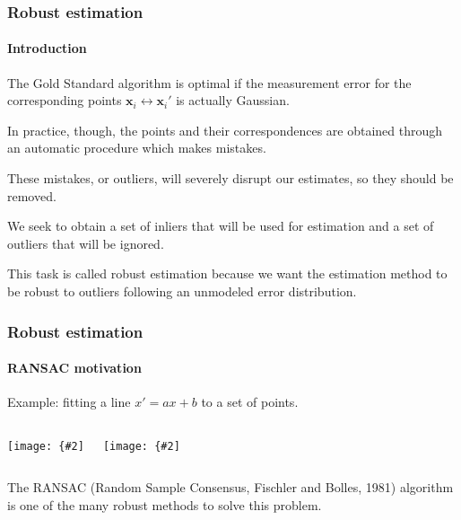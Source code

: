 \documentclass[aspectratio=169]{beamer}
\renewcommand{\vec}[1]{\boldsymbol{#1}}
\newcommand{\myfig}[3]{\centerline{\texttt{[image: \{\#2]}}}
\begin{document}
\begin{frame}
\frametitle{Robust estimation}
\framesubtitle{Introduction}

The Gold Standard algorithm is optimal if the \alert{measurement
  error} for the corresponding points $\vec{x}_i \leftrightarrow
\vec{x}_i'$ is actually \alert{Gaussian}.

\medskip

In practice, though, the points and their correspondences are obtained
through an \alert{automatic} procedure which makes \alert{mistakes}.

\medskip

These mistakes, or \alert{outliers}, will severely disrupt our
estimates, so they should be removed.

\medskip

We seek to obtain a set of \alert{inliers} that will be used for
estimation and a set of \alert{outliers} that will be ignored.

\medskip

This task is called \alert{robust estimation} because we want the
estimation method to be \alert{robust} to \alert{outliers} following
an unmodeled error distribution.

\end{frame}

\begin{frame}
\frametitle{Robust estimation}
\framesubtitle{RANSAC motivation}

Example: fitting a line $x'=ax+b$ to a set of points.

\medskip

\begin{columns}
\column{2.2in}
\myfig{2.1in}{HZ-fig3-7a}{Least squares fit is skewed by outliers.}
\column{2.2in}
\myfig{2.1in}{HZ-fig3-7b}{RANSAC support for two candidate lines.}
\end{columns}

\medskip

The \alert{RANSAC} (Random Sample Consensus, Fischler and Bolles,
1981) algorithm is one of the many robust methods to solve this
problem.

\end{frame}
\end{document}
